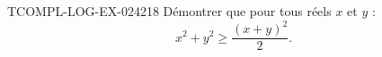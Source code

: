\begin{exercice}{TCOMPL-LOG-EX-024}{2}{18}
Démontrer que pour tous réels $x$ et $y$ :
\[ x^2 + y^2 \geq \frac{(x+y)^2}{2}. \]

\end{exercice}
